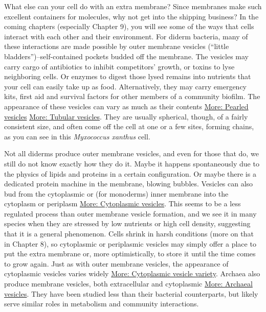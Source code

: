 \documentclass[]{tufte-book}
\begin{document}
What else can your cell do with an extra membrane? Since membranes make
such excellent containers for molecules, why not get into the shipping
business? In the coming chapters (especially Chapter 9), you will see
some of the ways that cells interact with each other and their
environment. For diderm bacteria, many of these interactions are made
possible by outer membrane vesicles (``little
bladders'')--self-contained pockets budded off the membrane. The
vesicles may carry cargo of antibiotics to inhibit competitors' growth,
or toxins to lyse neighboring cells. Or enzymes to digest those lysed
remains into nutrients that your cell can easily take up as food.
Alternatively, they may carry emergency kits, first aid and survival
factors for other members of a community biofilm. The appearance of
these vesicles can vary as much as their contents
\protect\hyperlink{Pearled_vesicles}{More: Pearled vesicles}
\protect\hyperlink{Tubular_vesicles}{More: Tubular vesicles}. They are
usually spherical, though, of a fairly consistent size, and often come
off the cell at one or a few sites, forming chains, as you can see in
this \emph{Myxococcus xanthus} cell.

Not all diderms produce outer membrane vesicles, and even for those that
do, we still do not know exactly how they do it. Maybe it happens
spontaneously due to the physics of lipids and proteins in a certain
configuration. Or maybe there is a dedicated protein machine in the
membrane, blowing bubbles. Vesicles can also bud from the cytoplasmic or
(for monoderms) inner membrane into the cytoplasm or periplasm
\protect\hyperlink{Cytoplasmic_vesicles}{More: Cytoplasmic vesicles}.
This seems to be a less regulated process than outer membrane vesicle
formation, and we see it in many species when they are stressed by low
nutrients or high cell density, suggesting that it is a general
phenomenon. Cells shrink in harsh conditions (more on that in Chapter
8), so cytoplasmic or periplasmic vesicles may simply offer a place to
put the extra membrane or, more optimistically, to store it until the
time comes to grow again. Just as with outer membrane vesicles, the
appearance of cytoplasmic vesicles varies widely
\protect\hyperlink{Cytoplasmic_vesicle_variety}{More: Cytoplasmic
vesicle variety}. Archaea also produce membrane vesicles, both
extracellular and cytoplasmic
\protect\hyperlink{Archaeal_vesicles}{More: Archaeal vesicles}. They
have been studied less than their bacterial counterparts, but likely
serve similar roles in metabolism and community interactions.
\end{document}
